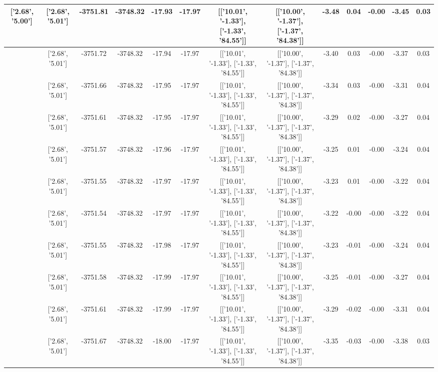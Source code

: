 \begin{table}[htbp]
\begin{adjustbox}{angle=90}
\begin{tabular}{|c|c|c|c|c|c|c|c|c|c|c|c|c|}
 ['2.68', '5.00'] & ['2.68', '5.01'] & -3751.81 & -3748.32 & -17.93 & -17.97 & [['10.01', '-1.33'], ['-1.33', '84.55']] & [['10.00', '-1.37'], ['-1.37', '84.38']] & -3.48 & 0.04 & -0.00 & -3.45 & 0.03\\ \hline
 ['2.68', '5.00'] & ['2.68', '5.01'] & -3751.72 & -3748.32 & -17.94 & -17.97 & [['10.01', '-1.33'], ['-1.33', '84.55']] & [['10.00', '-1.37'], ['-1.37', '84.38']] & -3.40 & 0.03 & -0.00 & -3.37 & 0.03\\ \hline
 ['2.68', '5.00'] & ['2.68', '5.01'] & -3751.66 & -3748.32 & -17.95 & -17.97 & [['10.01', '-1.33'], ['-1.33', '84.55']] & [['10.00', '-1.37'], ['-1.37', '84.38']] & -3.34 & 0.03 & -0.00 & -3.31 & 0.04\\ \hline
 ['2.68', '5.00'] & ['2.68', '5.01'] & -3751.61 & -3748.32 & -17.95 & -17.97 & [['10.01', '-1.33'], ['-1.33', '84.55']] & [['10.00', '-1.37'], ['-1.37', '84.38']] & -3.29 & 0.02 & -0.00 & -3.27 & 0.04\\ \hline
 ['2.68', '5.01'] & ['2.68', '5.01'] & -3751.57 & -3748.32 & -17.96 & -17.97 & [['10.01', '-1.33'], ['-1.33', '84.55']] & [['10.00', '-1.37'], ['-1.37', '84.38']] & -3.25 & 0.01 & -0.00 & -3.24 & 0.04\\ \hline
 ['2.68', '5.01'] & ['2.68', '5.01'] & -3751.55 & -3748.32 & -17.97 & -17.97 & [['10.01', '-1.33'], ['-1.33', '84.55']] & [['10.00', '-1.37'], ['-1.37', '84.38']] & -3.23 & 0.01 & -0.00 & -3.22 & 0.04\\ \hline
 ['2.68', '5.01'] & ['2.68', '5.01'] & -3751.54 & -3748.32 & -17.97 & -17.97 & [['10.01', '-1.33'], ['-1.33', '84.55']] & [['10.00', '-1.37'], ['-1.37', '84.38']] & -3.22 & -0.00 & -0.00 & -3.22 & 0.04\\ \hline
 ['2.69', '5.01'] & ['2.68', '5.01'] & -3751.55 & -3748.32 & -17.98 & -17.97 & [['10.01', '-1.33'], ['-1.33', '84.55']] & [['10.00', '-1.37'], ['-1.37', '84.38']] & -3.23 & -0.01 & -0.00 & -3.24 & 0.04\\ \hline
 ['2.69', '5.01'] & ['2.68', '5.01'] & -3751.58 & -3748.32 & -17.99 & -17.97 & [['10.01', '-1.33'], ['-1.33', '84.55']] & [['10.00', '-1.37'], ['-1.37', '84.38']] & -3.25 & -0.01 & -0.00 & -3.27 & 0.04\\ \hline
 ['2.69', '5.01'] & ['2.68', '5.01'] & -3751.61 & -3748.32 & -17.99 & -17.97 & [['10.01', '-1.33'], ['-1.33', '84.55']] & [['10.00', '-1.37'], ['-1.37', '84.38']] & -3.29 & -0.02 & -0.00 & -3.31 & 0.04\\ \hline
 ['2.69', '5.01'] & ['2.68', '5.01'] & -3751.67 & -3748.32 & -18.00 & -17.97 & [['10.01', '-1.33'], ['-1.33', '84.55']] & [['10.00', '-1.37'], ['-1.37', '84.38']] & -3.35 & -0.03 & -0.00 & -3.38 & 0.03\\ \hline

\end{tabular}
\end{adjustbox}
\end{table}
